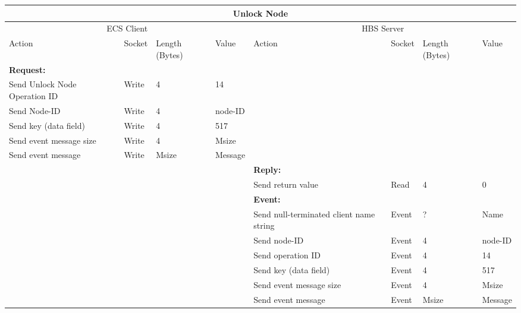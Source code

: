 \bigskip
\small
\begin{tabular}{|p{1.2in}|p{.4in}|p{.4in}|p{.5in}|p{1.2in}|p{.4in}|p{.4in}|p{.5in} |} \hline
\multicolumn{8}{|c|}{{\bf Unlock Node}} \\ \hline
\multicolumn{4}{|c|}{ECS Client} & \multicolumn{4}{|c|}{HBS Server} \\ \hline
Action            & Socket & Length  
                            (Bytes)& Value & Action       & Socket & Length 
                                                                    (Bytes)& Value \\ \hline
\multicolumn{4}{|l}{{\bf Request:}}&\multicolumn{4}{|l|}{~} \\ \hline
Send Unlock Node Operation ID  & Write  & 4     & 14     &              &        &       &       \\ \hline
Send Node-ID      & Write  & 4     &  node-ID &           &        &       &       \\ \hline
Send key (data field)    & Write  & 4     & 517   &              &        &       &       \\ \hline
Send event
message size      & Write  & 4     &  Msize &         &        &       &       \\ \hline
Send event message
                  & Write  &  Msize  &  Message &     &        &       &       \\ \hline
\multicolumn{4}{|l}{~}&\multicolumn{4}{|l|}{{\bf Reply:}} \\ \hline
                  &        &       &       & Send return
                                             value        & Read   &  4    & 0       \\ \hline
\multicolumn{4}{|l}{~}&\multicolumn{4}{|l|}{{\bf Event:}} \\ \hline
                  &        &       &       & Send null-terminated client
                                             name string  & Event  &  ?    & Name  \\ \hline
                  &        &       &       & Send node-ID  & Event  &   4   &   node-ID    \\  \hline
                  &        &       &       & Send operation 
                                             ID           & Event  &   4   &  14   \\ \hline
                  &        &       &       & Send key (data field)    & Event  &   4   &  517    \\ \hline
                  &        &       &       & Send event message
                                                  size    & Event  &   4   &  Msize \\ \hline
                  &        &       &       & Send event message
                                                          & Event  & Msize & Message  \\ \hline
\end{tabular}
\normalsize
\bigskip

